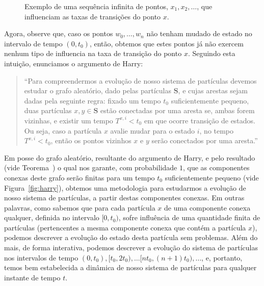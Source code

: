 \documentclass[twoside,openright,titlepage,numbers=noenddot,headinclude,  lineheaders footinclude=true,cleardoublepage=empty,
                                BCOR=5mm,paper=a4,fontsize=12pt ]{scrbook}
\theoremstyle{definition}
\begin{document}
\begin{figure}[h!] 
\centering

\caption{Exemplo de uma sequência infinita de pontos,
$x_1, x_2, \ldots$, que 
influenciam as taxas de transições do ponto $x$.}
\label{fig:influencia}
\end{figure}

Agora, observe que, caso os pontos $w_0, \ldots, w_n$ não
tenham mudado de estado no intervalo de tempo $(0,t_0)$,
então, obtemos que estes pontos já não exercem
nenhum tipo de influencia na taxa de transição do ponto 
$x$. Seguindo esta intuição, enunciamos o argumento de Harry:
\begin{quote}
``Para compreendermos a evolução
de nosso sistema de partículas devemos estudar o grafo 
aleatório, dado pelas partículas $\mathbf{S}$, e  cujas
 arestas sejam dadas pela seguinte regra:
 fixado um tempo $t_0$ suficientemente pequeno,
duas partículas $x, y \in \mathbf{S}$ estão conectadas
por uma aresta se, ambas forem vizinhas, e existir um tempo
$T^{x,i} < t_0$ em que ocorre  transição de estados. Ou seja, caso a partícula $x$ avalie mudar para
o estado $i$, no tempo $T^{x,i} < t_0$, então os pontos vizinhos
$x$ e $y$ serão conectados por uma aresta.''
\end{quote}

Em posse do grafo aleatório, resultante do argumento de Harry, 
e pelo resultado (vide Teorema~\cite{durret2}) o qual nos garante,
com probabilidade $1$, que
as componentes conexas %
 deste grafo serão finitas para um tempo $t_0$
suficientemente pequeno (vide Figura~\ref{fig:harry}), obtemos uma 
metodologia para
estudarmos a evolução de nosso sistema de partículas, a partir
destas componentes conexas. Em outras palavras, como sabemos
que para cada partícula $x$ de uma componente conexa qualquer,
definida no intervalo $[0, t_0)$, sofre influência de uma quantidade
finita de partículas (pertencentes a mesma componente conexa que contém
a partícula $x$), podemos descrever a evolução do estado desta
partícula sem problemas. Além do mais, de forma interativa,
podemos descrever a evolução do sistema de partículas nos intervalos
de tempo $(0, t_0), [t_0, 2t_0), \ldots
[nt_0, (n+1)t_0), \ldots$, e, portanto, temos bem estabelecida a dinâmica
de nosso sistema de partículas para qualquer instante de tempo $t$.
\end{document}
